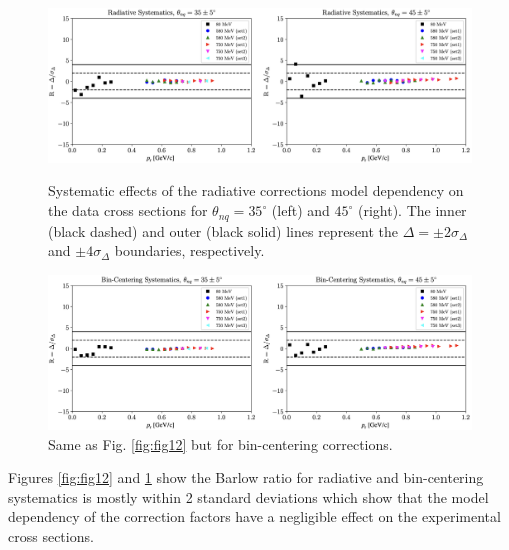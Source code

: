 \documentclass[aps, prl]{revtex4-2}  %
\begin{document}
\begin{figure}[!h]
\includegraphics[scale=0.33]{plots/rad_sys.png}
\caption{Systematic effects of the radiative corrections model dependency on the data cross sections for $\theta_{nq}=35^{\circ}$ (left) and $45^{\circ}$ (right). The inner (black dashed) and outer (black solid) lines represent the $\Delta=\pm2\sigma_{\Delta}$ and $\pm4\sigma_{\Delta}$ boundaries, respectively.  }
\label{fig:fig12}
\includegraphics[scale=0.33]{plots/bc_sys.png}
\caption{Same as Fig. \ref{fig:fig12} but for bin-centering corrections.}
\label{fig:fig13}
\end{figure}
\clearpage
Figures \ref{fig:fig12} and \ref{fig:fig13} show the Barlow ratio for radiative and bin-centering systematics is mostly within 2 standard deviations which show that
the model dependency of the correction factors have a negligible effect on the experimental cross sections.
\end{document}
